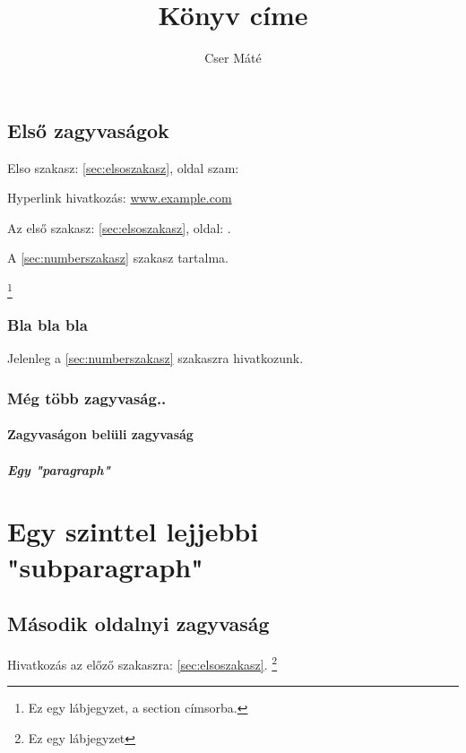 \documentclass[12pt]{book}
\begin{document}
\title{Könyv címe}
\author{Cser Máté}
\maketitle

\tableofcontents
\newpage

\section[zagyvaság]{Első zagyvaságok}
Elso szakasz: \ref{sec:elsoszakasz}, oldal szam: \pageref{sec:elsoszakasz}
\label{sec:elsoszakasz}

Hyperlink hivatkozás:
\href{https://www.example.com}{www.example.com}

Az első szakasz: \autoref{sec:elsoszakasz}, oldal: .

A \ref{sec:numberszakasz} szakasz tartalma.

\footnote{Ez egy lábjegyzet, a section címsorba.}
\subsection{Bla bla bla}
Jelenleg a \cref{sec:numberszakasz} szakaszra hivatkozunk. \\
\label{sub:alszakasz1}
\hulipsum[2]  %
\subsection{Még több zagyvaság..}
\label{sub:alszakasz2}
\hulipsum[2]
\subsubsection{Zagyvaságon belüli zagyvaság}
\label{sub:alszakasz3}
\paragraph{Egy "paragraph"}
\chapter{Egy szinttel lejjebbi "subparagraph"}
\section{Második oldalnyi zagyvaság}
Hivatkozás az előző szakaszra: \vref{sec:elsoszakasz}.
\hulipsum[2-3] \linebreak
\footnote{Ez egy lábjegyzet}
\end{document}

